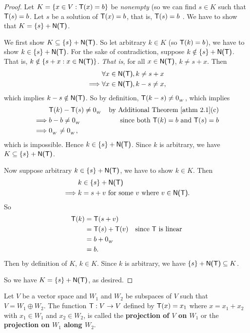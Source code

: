 \begin{proof}
Let \(K = \{ x \in V : \textsf{T}(x) = b \}\) be \emph{nonempty} (so we can find \(s \in K\) such that \(\textsf{T}(s) = b\).
Let \(s\) be a solution of \(\textsf{T}(x) = b\), that is, \(\textsf{T}(s) = b\) .
We have to show that \(K = \{ s \} + \textsf{N(T)}\).

We first show \(K \subseteq \{ s \} + \textsf{N(T)}\).
So let arbitrary \(k \in K\) (so \(\textsf{T}(k) = b\)), we have to show \(k \in \{ s \} + \textsf{N(T)}\).
For the sake of contradiction, suppose \(k \notin \{ s \} + \textsf{N(T)}\).
That is, \(k \notin \{ s + x : x \in \textsf{N(T)} \}\).
\emph{That is}, for all \(x \in \textsf{N(T)}\), \(k \ne s + x\).
Then
\begin{align*}
             & \forall x \in \textsf{N(T)}, k \ne s + x \\
    \implies & \forall x \in \textsf{N(T)}, k - s \ne x,
\end{align*}
which implies \(k - s \notin \textsf{N(T)}\).
So by definition, \(\textsf{T}(k - s) \ne 0_{_W}\), which implies 
\begin{align*}
             & \T(k) - \T(s) \ne \OW & \text{by \ATHM{2.1}(c)} \\
    \implies & b - b \ne \OW & \text{since both \(\T(k) = b\) and \(\T(s) = b\)} \\
    \implies & \OW \ne \OW,
\end{align*}
which is impossible.
Hence \(k \in \{ s \} + \textsf{N(T)}\).
Since \(k\) is arbitrary, we have \(K \subseteq \{ s \} + \textsf{N(T)}\).

Now suppose arbitrary \(k \in \{ s \} + \textsf{N(T)}\), we have to show \(k \in K\).
Then
\begin{align*}
             & k \in \{ s \} + \textsf{N(T)} \\
    \implies & k = s + v \text{ for some \(v\) where } v \in \textsf{N(T)}.
\end{align*}
So
\begin{align*}
    \textsf{T}(k) & = \textsf{T}(s + v) \\
          & = \textsf{T}(s) + \textsf{T}(v) & \text{since \(\textsf{T}\) is linear} \\
          & = b + 0_{_W} \\
          & = b.
\end{align*}
Then by definition of \(K\), \(k \in K\).
Since \(k\) is arbitrary, we have \(\{ s \} + \textsf{N(T)} \subseteq K\).

So we have \(K = \{ s \} + \textsf{N(T)}\), as desired.
\end{proof}

\begin{additional definition} \label{adef 2.2}
Let \(V\) be a vector space and \(W_1\) and \(W_2\) be subspaces of \(V\) such that \(V = W_1 \oplus W_2\).
The function \(\textsf{T} : V \to V\) defined by \(\textsf{T}(x) = x_1\) where \(x = x_1 + x_2\) with \(x_1 \in W_1\) and \(x_2 \in W_2\), is called the \textbf{projection of \(V\) on \(W_1\)} or the \textbf{projection on \(W_1\) along \(W_2\)}.
\end{additional definition}

